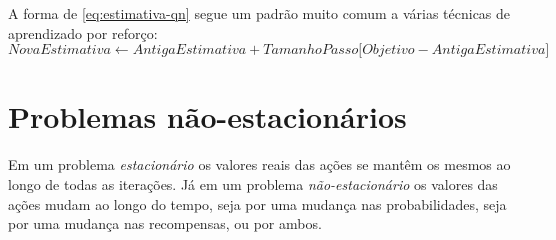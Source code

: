 \documentclass{article}
\newcommand{\todo}[1]{}
\begin{document}
        A forma de \eqref{eq:estimativa-qn} segue um padrão muito comum a várias técnicas de aprendizado por reforço:
        \begin{equation}
            NovaEstimativa \leftarrow AntigaEstimativa + TamanhoPasso \Big[ Objetivo - AntigaEstimativa \Big]
        \end{equation}
            
    \section{Problemas não-estacionários}

        Em um problema \emph{estacionário} os valores reais das ações se mantêm os mesmos ao longo de todas as iterações. Já em um problema \emph{não-estacionário} os valores das ações mudam ao longo do tempo, seja por uma mudança nas probabilidades, seja por uma mudança nas recompensas, ou por ambos.

        \todo{estacionaria vs nao estacionaria (exemplo das barras do 10-armed testbed)}
        
\end{document}

